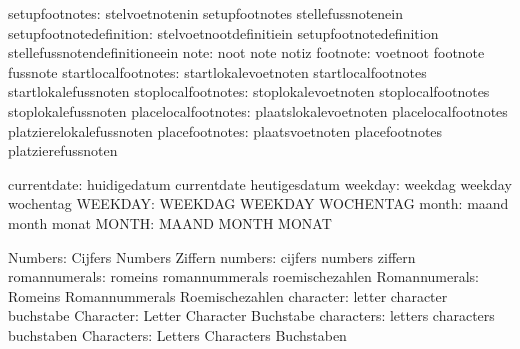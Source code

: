                setupfootnotes:  stelvoetnotenin              setupfootnotes
                                stellefussnotenein
      setupfootnotedefinition:  stelvoetnootdefinitiein      setupfootnotedefinition
                                stellefussnotendefinitioneein %
                         note:  noot                         note
                                notiz
                     footnote:  voetnoot                     footnote
                                fussnote
          startlocalfootnotes:  startlokalevoetnoten         startlocalfootnotes
                                startlokalefussnoten
           stoplocalfootnotes:  stoplokalevoetnoten          stoplocalfootnotes
                                stoplokalefussnoten
          placelocalfootnotes:  plaatslokalevoetnoten        placelocalfootnotes
                                platzierelokalefussnoten
               placefootnotes:  plaatsvoetnoten              placefootnotes
                                platzierefussnoten

                  currentdate:  huidigedatum                 currentdate
                                heutigesdatum
                      weekday:  weekdag                      weekday
                                wochentag
                      WEEKDAY:  WEEKDAG                      WEEKDAY
                                WOCHENTAG
                        month:  maand                        month
                                monat
                        MONTH:  MAAND                        MONTH
                                MONAT

                      Numbers:  Cijfers                      Numbers
                                Ziffern
                      numbers:  cijfers                      numbers
                                ziffern
                romannumerals:  romeins                      romannummerals
                                roemischezahlen
                Romannumerals:  Romeins                      Romannummerals
                                Roemischezahlen
                    character:  letter                       character
                                buchstabe
                    Character:  Letter                       Character
                                Buchstabe
                   characters:  letters                      characters
                                buchstaben
                   Characters:  Letters                      Characters
                                Buchstaben

